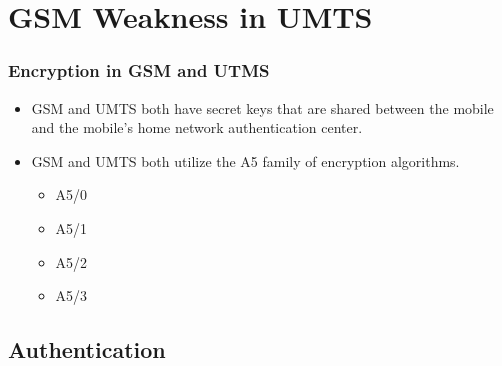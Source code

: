 \documentclass{beamer}
\begin{document}
	
\section{GSM Weakness in UMTS}

	

	\begin{frame}
	\frametitle{Encryption in GSM and UTMS}
	\begin{itemize}
	
	
		\item GSM and UMTS both have secret keys that are shared between the mobile and the mobile's home network authentication center.
		
		\item GSM and UMTS both utilize the A5 family of encryption algorithms. 
		 \begin{itemize}
			\item A5/0 
			\item A5/1
			\item A5/2
			\item A5/3 
		\end{itemize}
		\end{itemize}
	\end{frame}
	
\subsection{Authentication}
\end{document}
